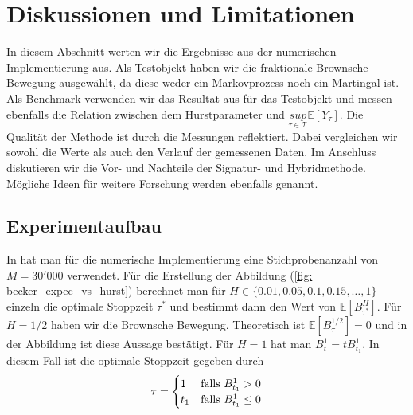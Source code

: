 \documentclass[12pt,titlepage,headsepline]{article}
\begin{document}
    \section{Diskussionen und Limitationen}
      In diesem Abschnitt werten wir die Ergebnisse aus der numerischen Implementierung aus. Als Testobjekt haben wir die fraktionale Brownsche Bewegung ausgewählt, da diese weder ein Markovprozess noch ein Martingal ist. Als Benchmark verwenden wir das Resultat aus \cite{becker_deep_2019} für das Testobjekt und messen ebenfalls die Relation zwischen dem Hurstparameter und $\underset{\tau \in \mathcal{T}}{sup} \mathbb{E}[Y_{\tau}]$. Die Qualität der Methode ist durch die Messungen reflektiert. Dabei vergleichen wir sowohl die Werte als auch den Verlauf der gemessenen Daten.
      \hfill\break
      Im Anschluss diskutieren wir die Vor- und Nachteile der Signatur- und Hybridmethode. Mögliche Ideen für weitere Forschung werden ebenfalls genannt.
      \subsection{Experimentaufbau}
        In \cite{becker_deep_2019} hat man für die numerische Implementierung eine Stichprobenanzahl von $M = 30'000$ verwendet. Für die Erstellung der Abbildung (\ref{fig: becker_expec_vs_hurst}) berechnet man für $H \in \{0.01,0.05,0.1,0.15,\ldots,1\}$ einzeln die optimale Stoppzeit $\tau^*$ und bestimmt dann den Wert von $\mathbb{E}[B_{\tau^*}^H]$. Für
        $H=1/2$ haben wir die Brownsche Bewegung. Theoretisch ist $\mathbb{E}[B^{1/2}_{\tau}] = 0$ und in der Abbildung ist diese Aussage bestätigt. Für $H = 1$ hat man $B_t^1 = tB_{t_1}^1$. In diesem Fall ist die optimale Stoppzeit gegeben durch
        \begin{align*}
          \tau =
          \begin{cases}
            1 & \textup{falls } B_{t_1}^1 > 0 \\
            t_1 & \textup{falls } B_{t_1}^1 \leq 0
          \end{cases}
        \end{align*}
\end{document}
